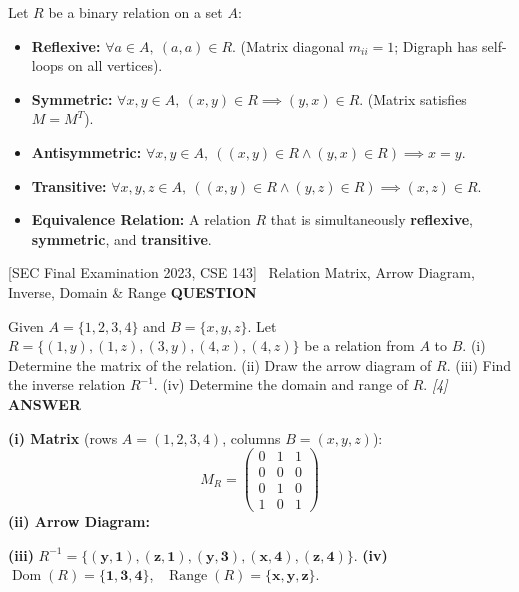 \documentclass[11pt,a4paper]{article}
\newcommand{\Qlabel}{\textbf{\color{navy}\footnotesize\MakeUppercase{Question}}\par\smallskip}
\newcommand{\Alabel}{\textbf{\color{teal}\footnotesize\MakeUppercase{Answer}}\par\smallskip}
\begin{document}
\begin{defbox}
Let $R$ be a binary relation on a set $A$:
\begin{itemize}
    \item \textbf{Reflexive:} $\forall a \in A, \ (a, a) \in R$. \quad (Matrix diagonal $m_{ii} = 1$; Digraph has self-loops on all vertices).
    \item \textbf{Symmetric:} $\forall x, y \in A, \ (x, y) \in R \implies (y, x) \in R$. \quad (Matrix satisfies $M = M^T$).
    \item \textbf{Antisymmetric:} $\forall x, y \in A, \ ((x, y) \in R \land (y, x) \in R) \implies x = y$.
    \item \textbf{Transitive:} $\forall x, y, z \in A, \ ((x, y) \in R \land (y, z) \in R) \implies (x, z) \in R$.
    \item \textbf{Equivalence Relation:} A relation $R$ that is simultaneously \textbf{reflexive}, \textbf{symmetric}, and \textbf{transitive}.
\end{itemize}
\end{defbox}

\begin{exambox}{[SEC Final Examination 2023, CSE 143] \ Relation Matrix, Arrow Diagram, Inverse, Domain \& Range}
\Qlabel
Given $A = \{1, 2, 3, 4\}$ and $B = \{x, y, z\}$. Let $R = \{(1, y), (1, z), (3, y), (4, x), (4, z)\}$ be a relation from $A$ to $B$. (i) Determine the matrix of the relation. (ii) Draw the arrow diagram of $R$. (iii) Find the inverse relation $R^{-1}$. (iv) Determine the domain and range of $R$. \hfill\textit{[4]}
\tcblower
\Alabel
\textbf{(i) Matrix} (rows $A=(1,2,3,4)$, columns $B=(x,y,z)$):
\[
M_R = \begin{pmatrix}
0 & 1 & 1 \\
0 & 0 & 0 \\
0 & 1 & 0 \\
1 & 0 & 1
\end{pmatrix}
\]
\textbf{(ii) Arrow Diagram:}
\begin{center}
\end{center}
\textbf{(iii)} $R^{-1} = \mathbf{\{(y,1),(z,1),(y,3),(x,4),(z,4)\}}$. \quad
\textbf{(iv)} $\operatorname{Dom}(R) = \mathbf{\{1,3,4\}}$, \ $\operatorname{Range}(R) = \mathbf{\{x,y,z\}}$.
\end{exambox}
\end{document}
